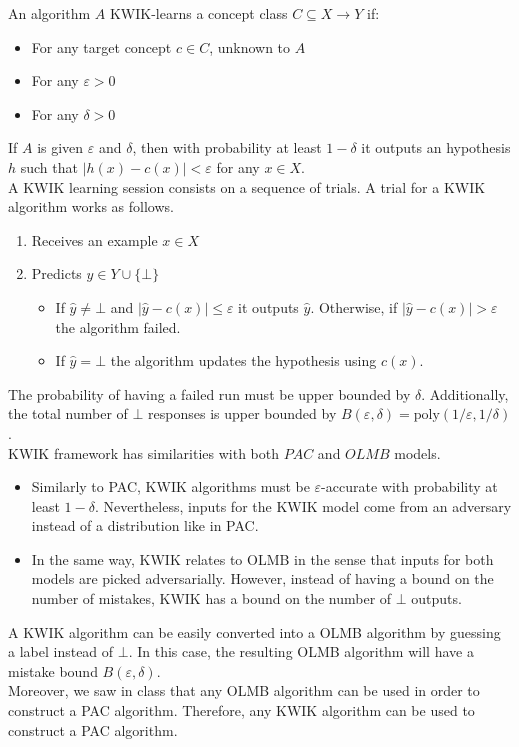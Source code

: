An algorithm $A$ KWIK-learns a concept class $C \subseteq X \to Y$ if:
\begin{itemize}
  \item For any target concept $c \in C$, unknown to $A$
  \item For any $\varepsilon > 0$
  \item For any $\delta > 0$
\end{itemize}

If $A$ is given $\varepsilon$ and $\delta$, then with probability at least $1-\delta$ it outputs an
hypothesis $h$ such that $|h(x) - c(x)| < \varepsilon$ for any $x \in X$. \\

A KWIK learning session consists on a sequence of trials.
A trial for a KWIK algorithm works as follows.
\begin{enumerate}
  \item Receives an example $x \in X$
  \item Predicts $\hat{y} \in Y \cup \{\bot\}$
    \begin{itemize}
      \item If $\hat{y} \neq \bot$ and $|\hat{y} - c(x)| \leq \varepsilon$ it outputs $\hat{y}$. Otherwise, if $|\hat{y} - c(x)| > \varepsilon$ the algorithm failed.
      \item If $\hat{y} = \bot$ the algorithm updates the hypothesis using $c(x)$.
    \end{itemize}
\end{enumerate}

The probability of having a failed run must be upper bounded by $\delta$. Additionally, the total number of $\bot$ responses is upper bounded by $B(\varepsilon,\delta)=\text{poly}(1/\varepsilon,1/\delta)$. \\

KWIK framework has similarities with both $PAC$ and $OLMB$ models.
\begin{itemize}
  \item Similarly to PAC, KWIK algorithms must be $\varepsilon$-accurate with probability at least $1-\delta$. Nevertheless, inputs for the KWIK model come from an adversary instead of a distribution like in PAC.
  \item In the same way, KWIK relates to OLMB in the sense that inputs for both models are picked adversarially. However, instead of having a bound on the number of mistakes, KWIK has a bound on the number of $\bot$ outputs.
\end{itemize}

A KWIK algorithm can be easily converted into a OLMB algorithm by guessing a label instead of $\bot$. In this case, the resulting OLMB algorithm will have a mistake bound $B(\varepsilon,\delta)$.\\

Moreover, we saw in class that any OLMB algorithm can be used in order to construct a PAC algorithm. Therefore, any KWIK algorithm can be used to construct a PAC algorithm.

